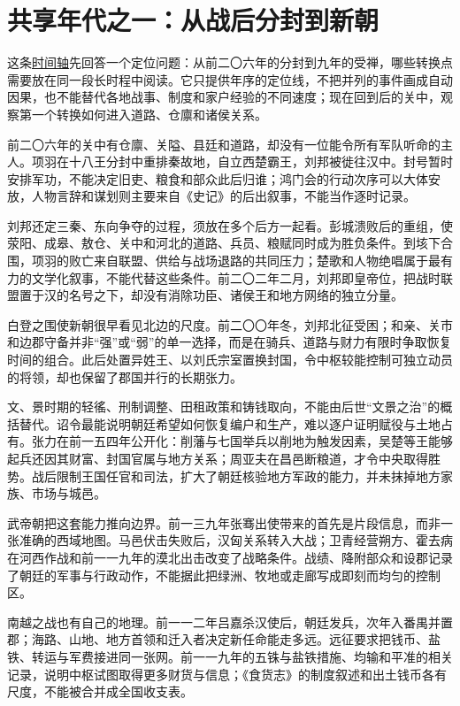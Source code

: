 \section{共享年代之一：从战后分封到新朝}
\label{sec:han-shared-chronology}

这条\hyperref[fig:han-period-timeline]{时间轴}先回答一个定位问题：从前二〇六年的分封到九年的受禅，哪些转换点需要放在同一段长时程中阅读。它只提供年序的定位线，不把并列的事件画成自动因果，也不能替代各地战事、制度和家户经验的不同速度；现在回到后的关中，观察第一个转换如何进入道路、仓廪和诸侯关系。


前二〇六年的关中有仓廪、关隘、县廷和道路，却没有一位能令所有军队听命的主人。项羽在十八王分封中重排秦故地，自立西楚霸王，刘邦被徙往汉中。封号暂时安排军功，不能决定旧吏、粮食和部众此后归谁；鸿门会的行动次序可以大体安放，人物言辞和谋划则主要来自《史记》的后出叙事，不能当作逐时记录。

刘邦还定三秦、东向争夺的过程，须放在多个后方一起看。彭城溃败后的重组，使荥阳、成皋、敖仓、关中和河北的道路、兵员、粮赋同时成为胜负条件。到垓下合围，项羽的败亡来自联盟、供给与战场退路的共同压力；楚歌和人物绝唱属于最有力的文学化叙事，不能代替这些条件。前二〇二年二月，刘邦即皇帝位，把战时联盟置于汉的名号之下，却没有消除功臣、诸侯王和地方网络的独立分量。

白登之围使新朝很早看见北边的尺度。前二〇〇年冬，刘邦北征受困；和亲、关市和边郡守备并非“强”或“弱”的单一选择，而是在骑兵、道路与财力有限时争取恢复时间的组合。此后处置异姓王、以刘氏宗室置换封国，令中枢较能控制可独立动员的将领，却也保留了郡国并行的长期张力。

文、景时期的轻徭、刑制调整、田租政策和铸钱取向，不能由后世“文景之治”的概括替代。诏令最能说明朝廷希望如何恢复编户和生产，难以逐户证明赋役与土地占有。张力在前一五四年公开化：削藩与七国举兵以削地为触发因素，吴楚等王能够起兵还因其财富、封国官属与地方关系；周亚夫在昌邑断粮道，才令中央取得胜势。战后限制王国任官和司法，扩大了朝廷核验地方军政的能力，并未抹掉地方家族、市场与城邑。

武帝朝把这套能力推向边界。前一三九年张骞出使带来的首先是片段信息，而非一张准确的西域地图。马邑伏击失败后，汉匈关系转入大战；卫青经营朔方、霍去病在河西作战和前一一九年的漠北出击改变了战略条件。战绩、降附部众和设郡记录了朝廷的军事与行政动作，不能据此把绿洲、牧地或走廊写成即刻而均匀的控制区。

南越之战也有自己的地理。前一一二年吕嘉杀汉使后，朝廷发兵，次年入番禺并置郡；海路、山地、地方首领和迁入者决定新任命能走多远。远征要求把钱币、盐铁、转运与军费接进同一张网。前一一九年的五铢与盐铁措施、均输和平准的相关记录，说明中枢试图取得更多财货与信息；《食货志》的制度叙述和出土钱币各有尺度，不能被合并成全国收支表。


